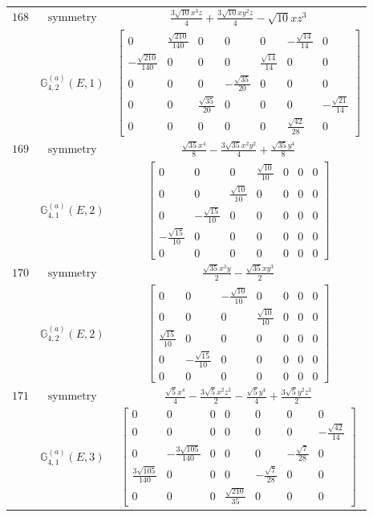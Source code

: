 \documentclass[fleqn,8pt,landscape]{jsarticle}
\begin{document}
\begin{longtable}{ccc}
$ 168 $ & $ \text{symmetry} $ & $ \frac{3 \sqrt{10} x^{3} z}{4} + \frac{3 \sqrt{10} x y^{2} z}{4} - \sqrt{10} x z^{3} $ \\
$  $ & $ \mathbb{G}_{4,2}^{(a)}(E,1) $ & $ \begin{bmatrix} 0 & \frac{\sqrt{210}}{140} & 0 & 0 & 0 & - \frac{\sqrt{14}}{14} & 0 \\ - \frac{\sqrt{210}}{140} & 0 & 0 & 0 & \frac{\sqrt{14}}{14} & 0 & 0 \\ 0 & 0 & 0 & - \frac{\sqrt{35}}{20} & 0 & 0 & 0 \\ 0 & 0 & \frac{\sqrt{35}}{20} & 0 & 0 & 0 & - \frac{\sqrt{21}}{14} \\ 0 & 0 & 0 & 0 & 0 & \frac{\sqrt{42}}{28} & 0 \end{bmatrix} $ \\ \hline
$ 169 $ & $ \text{symmetry} $ & $ \frac{\sqrt{35} x^{4}}{8} - \frac{3 \sqrt{35} x^{2} y^{2}}{4} + \frac{\sqrt{35} y^{4}}{8} $ \\
$  $ & $ \mathbb{G}_{4,1}^{(a)}(E,2) $ & $ \begin{bmatrix} 0 & 0 & 0 & \frac{\sqrt{10}}{10} & 0 & 0 & 0 \\ 0 & 0 & \frac{\sqrt{10}}{10} & 0 & 0 & 0 & 0 \\ 0 & - \frac{\sqrt{15}}{10} & 0 & 0 & 0 & 0 & 0 \\ - \frac{\sqrt{15}}{10} & 0 & 0 & 0 & 0 & 0 & 0 \\ 0 & 0 & 0 & 0 & 0 & 0 & 0 \end{bmatrix} $ \\ \hline
$ 170 $ & $ \text{symmetry} $ & $ \frac{\sqrt{35} x^{3} y}{2} - \frac{\sqrt{35} x y^{3}}{2} $ \\
$  $ & $ \mathbb{G}_{4,2}^{(a)}(E,2) $ & $ \begin{bmatrix} 0 & 0 & - \frac{\sqrt{10}}{10} & 0 & 0 & 0 & 0 \\ 0 & 0 & 0 & \frac{\sqrt{10}}{10} & 0 & 0 & 0 \\ \frac{\sqrt{15}}{10} & 0 & 0 & 0 & 0 & 0 & 0 \\ 0 & - \frac{\sqrt{15}}{10} & 0 & 0 & 0 & 0 & 0 \\ 0 & 0 & 0 & 0 & 0 & 0 & 0 \end{bmatrix} $ \\ \hline
$ 171 $ & $ \text{symmetry} $ & $ \frac{\sqrt{5} x^{4}}{4} - \frac{3 \sqrt{5} x^{2} z^{2}}{2} - \frac{\sqrt{5} y^{4}}{4} + \frac{3 \sqrt{5} y^{2} z^{2}}{2} $ \\
$  $ & $ \mathbb{G}_{4,1}^{(a)}(E,3) $ & $ \begin{bmatrix} 0 & 0 & 0 & 0 & 0 & 0 & 0 \\ 0 & 0 & 0 & 0 & 0 & 0 & - \frac{\sqrt{42}}{14} \\ 0 & - \frac{3 \sqrt{105}}{140} & 0 & 0 & 0 & - \frac{\sqrt{7}}{28} & 0 \\ \frac{3 \sqrt{105}}{140} & 0 & 0 & 0 & - \frac{\sqrt{7}}{28} & 0 & 0 \\ 0 & 0 & 0 & \frac{\sqrt{210}}{35} & 0 & 0 & 0 \end{bmatrix} $ \\ \hline

\end{longtable}
\end{document}
